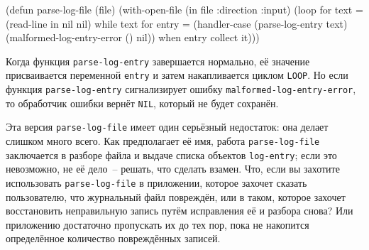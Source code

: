 \begin{myverb}
(defun parse-log-file (file)
  (with-open-file (in file :direction :input)
    (loop for text = (read-line in nil nil) while text
       for entry = (handler-case (parse-log-entry text)
                     (malformed-log-entry-error () nil))
       when entry collect it)))
\end{myverb}

Когда функция \lstinline{parse-log-entry} завершается нормально, её значение присваивается
переменной \lstinline{entry} и затем накапливается циклом \lstinline{LOOP}. Но если функция
\lstinline{parse-log-entry} сигнализирует ошибку \lstinline{malformed-log-entry-error}, то
обработчик ошибки вернёт \lstinline{NIL}, который не будет сохранён.


Эта версия \lstinline{parse-log-file} имеет один серьёзный недостаток: она делает слишком много
всего. Как предполагает её имя, работа \lstinline{parse-log-file} заключается в разборе файла и
выдаче списка объектов \lstinline{log-entry}; если это невозможно, не её дело~-- решать, что
сделать взамен. Что, если вы захотите использовать \lstinline{parse-log-file} в приложении,
которое захочет сказать пользователю, что журнальный файл повреждён, или в таком, которое
захочет восстановить неправильную запись путём исправления её и разбора снова? Или
приложению достаточно пропускать их до тех пор, пока не накопится определённое количество
повреждённых записей.

